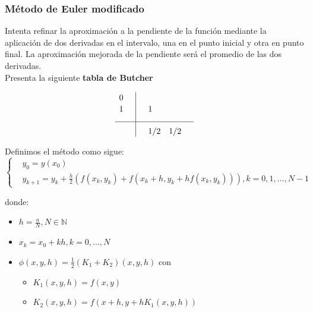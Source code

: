\documentclass[paper=a4, fontsize=11pt]{scrartcl} %
\numberwithin{equation}{section}
\begin{document}
	\subsubsection{Método de Euler modificado}
	  Intenta refinar la aproximación a la pendiente de la función mediante la aplicación de dos derivadas en el intervalo, una en el punto inicial y otra en punto final. La aproximación mejorada de la pendiente será el promedio de las dos derivadas.\\
	Presenta la siguiente \textbf{tabla de Butcher}\begin{table}[h]
		\begin{equation*}
		\begin{array}{l | c c c}
		\rule{0pt}{2,3ex} 0    \quad &   &  \\
		\rule{0pt}{2,3ex} 1 & 1 &  & \\[2,0ex] \hline
		\rule{0pt}{3,3ex}              & \quad 1/2  & 1/2  & 
		\end{array}
		\end{equation*}
	\end{table}
	\newpage
	Definimos el método como sigue:
	\begin{equation*}
	[RK2]\begin{cases} 
	&\text{$y_0 = y(x_0)$}
	\\
	&\text{$y_{k+1} = y_k + \frac{h}{2}(f(x_k,y_k)+f(x_k+h,y_k+hf(x_k,y_k))),  k= 0,1,...,N-1$} 
	\end{cases} 
	\end{equation*}
	
	donde:
	\begin{itemize}
		\item $h=\frac{a}{N} , N\in\mathbb{N}$
		\item $x_k = x_0 + kh , k=0,...,N$
		\item $\phi(x,y,h) = \frac{1}{2}(K_1+K_2)(x,y,h)$ con 
		\begin{itemize}
			\item $K_1(x,y,h)=f(x,y)$
			\item $K_2(x,y,h)=f(x+h,y+hK_1(x,y,h))$
		\end{itemize}
	\end{itemize}
	
\end{document}
